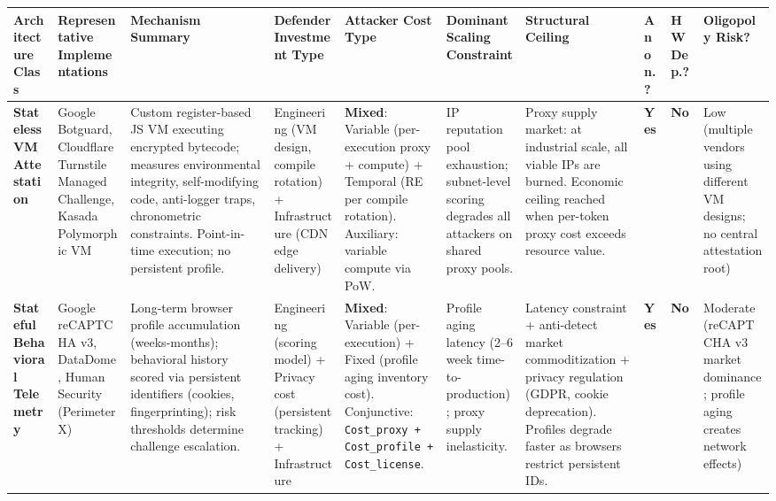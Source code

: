 \documentclass[12pt]{article}
\newcommand{\yes}{\textcolor{yesgreen}{\textbf{Yes}}}
\newcommand{\no}{\textcolor{nored}{\textbf{No}}}
\begin{document}
\thispagestyle{empty}

\begin{table}[htbp]
\centering
\fontsize{7pt}{8.5pt}\selectfont
\setlength{\tabcolsep}{3pt}
\renewcommand{\arraystretch}{1.35}

\begin{tabularx}{\textwidth}{
    >{\RaggedRight}p{1.6cm}
    >{\RaggedRight}p{2.2cm}
    >{\RaggedRight}p{2.4cm}
    >{\RaggedRight}p{1.8cm}
    >{\RaggedRight}p{2.0cm}
    >{\RaggedRight}p{2.0cm}
    >{\RaggedRight}p{2.2cm}
    >{\centering\arraybackslash}p{0.9cm}
    >{\centering\arraybackslash}p{1.1cm}
    >{\RaggedRight}p{1.5cm}
}
\toprule
\rowcolor{headerbg}
\textbf{Architecture Class} &
\textbf{Representative Implementations} &
\textbf{Mechanism Summary} &
\textbf{Defender Investment Type} &
\textbf{Attacker Cost Type} &
\textbf{Dominant Scaling Constraint} &
\textbf{Structural Ceiling} &
\textbf{Anon.?} &
\textbf{HW Dep.?} &
\textbf{Oligopoly Risk?} \\
\midrule

\rowcolor{white}
\textbf{Stateless VM Attestation} &
Google Botguard, Cloudflare Turnstile Managed Challenge, Kasada Polymorphic VM &
Custom register-based JS VM executing encrypted bytecode; measures environmental integrity, self-modifying code, anti-logger traps, chronometric constraints. Point-in-time execution; no persistent profile. &
Engineering (VM design, compile rotation) + Infrastructure (CDN edge delivery) &
\textbf{Mixed}: Variable (per-execution proxy + compute) + Temporal (RE per compile rotation). Auxiliary: variable compute via PoW. &
IP reputation pool exhaustion; subnet-level scoring degrades all attackers on shared proxy pools. &
Proxy supply market: at industrial scale, all viable IPs are burned. Economic ceiling reached when per-token proxy cost exceeds resource value. &
\yes &
\no &
Low (multiple vendors using different VM designs; no central attestation root) \\

\addlinespace[2pt]
\rowcolor{rowalt}
\textbf{Stateful Behavioral Telemetry} &
Google reCAPTCHA v3, DataDome, Human Security (PerimeterX) &
Long-term browser profile accumulation (weeks-months); behavioral history scored via persistent identifiers (cookies, fingerprinting); risk thresholds determine challenge escalation. &
Engineering (scoring model) + Privacy cost (persistent tracking) + Infrastructure &
\textbf{Mixed}: Variable (per-execution) + Fixed (profile aging inventory cost). Conjunctive: \texttt{Cost\_proxy + Cost\_profile + Cost\_license}. &
Profile aging latency (2--6 week time-to-production); proxy supply inelasticity. &
Latency constraint + anti-detect market commoditization + privacy regulation (GDPR, cookie deprecation). Profiles degrade faster as browsers restrict persistent IDs. &
\yes &
\no &
Moderate (reCAPTCHA v3 market dominance; profile aging creates network effects) \\


\end{tabularx}
\end{table}
\end{document}
